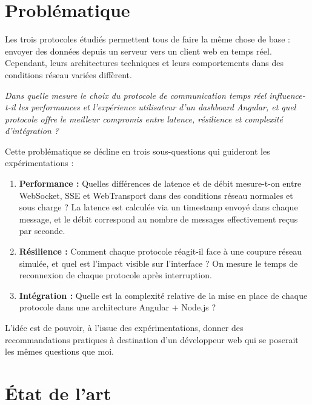 \section{Problématique}

Les trois protocoles étudiés permettent tous de faire la même chose de base : envoyer des données depuis un serveur vers un client web en temps réel. Cependant, leurs architectures techniques et leurs comportements dans des conditions réseau variées diffèrent.

\begin{center}
\textit{Dans quelle mesure le choix du protocole de communication temps réel influence-t-il les performances et l'expérience utilisateur d'un dashboard Angular, et quel protocole offre le meilleur compromis entre latence, résilience et complexité d'intégration ?}
\end{center}

Cette problématique se décline en trois sous-questions qui guideront les expérimentations :

\begin{enumerate}
    \item \textbf{Performance :} Quelles différences de latence et de débit mesure-t-on entre WebSocket, SSE et WebTransport dans des conditions réseau normales et sous charge ? La latence est calculée via un timestamp envoyé dans chaque message, et le débit correspond au nombre de messages effectivement reçus par seconde.
    \item \textbf{Résilience :} Comment chaque protocole réagit-il face à une coupure réseau simulée, et quel est l'impact visible sur l'interface ? On mesure le temps de reconnexion de chaque protocole après interruption.
    \item \textbf{Intégration :} Quelle est la complexité relative de la mise en place de chaque protocole dans une architecture Angular + Node.js ?
\end{enumerate}

L'idée est de pouvoir, à l'issue des expérimentations, donner des recommandations pratiques à destination d'un développeur web qui se poserait les mêmes questions que moi.

\section{État de l'art}

